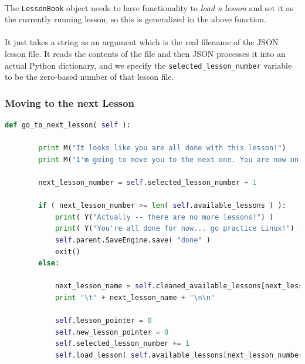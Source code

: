\documentclass[11pt]{article}
\begin{document}
	\paragraph{}

	\paragraph{} The \texttt{LessonBook} object needs to have functionality to \textit{load a lesson} and set it as the currently running lesson, so this is generalized in the above function. 

	\paragraph{} It just takes a string as an argument which is the real filename of the JSON lesson file. It reads the contents of the file and then JSON processes it into an actual Python dictionary, and we specify the \texttt{selected\_lesson\_number} variable to be the zero-based number of that lesson file.

	\newpage

	\subsubsection{Moving to the next Lesson }

	\begin{lstlisting}[language=Python]
	def go_to_next_lesson( self ):

		print M("It looks like you are all done with this lesson!")
		print M("I'm going to move you to the next one. You are now on lesson:\n")

		next_lesson_number = self.selected_lesson_number + 1

		if ( next_lesson_number >= len( self.available_lessons ) ):
			print( Y("Actually -- there are no more lessons!") )
			print( Y("You're all done for now... go practice Linux!") )
			self.parent.SaveEngine.save( "done" )
			exit()
		else:

			next_lesson_name = self.cleaned_available_lessons[next_lesson_number]
			print "\t" + next_lesson_name + "\n\n"

			self.lesson_pointer = 0
			self.new_lesson_pointer = 0
			self.selected_lesson_number += 1
			self.load_lesson( self.available_lessons[next_lesson_number] )
	\end{lstlisting}

	\paragraph{}
\end{document}
